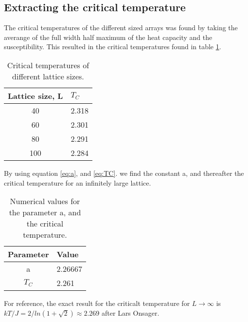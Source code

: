 \documentclass[../main.tex]{subfiles}
\begin{document}
\subsection{Extracting the critical temperature}
The critical temperatures of the different sized arrays was found by taking the averange of the full width half maximum of the heat capacity and the susceptibility. This resulted in the critical temperatures found in table \ref{tab:results-TC-lattices}.
\begin{table}[!h]
  \begin{center}
    \begin{tabular}{|c| l|}
      \hline
      Lattice size, L & $T_C$ \\
      \hline
      40 & 2.318\\
      60 & 2.301\\
      80 & 2.291\\
      100 & 2.284\\
      \hline
    \end{tabular}
    \caption{Critical temperatures of different lattice sizes.}
    \label{tab:results-TC-lattices}
  \end{center}
\end{table}
\FloatBarrier
By using equation \eqref{eq:a}, and \eqref{eq:TC}. we find the constant a, and thereafter the critical temperature for an infinitely large lattice.

\begin{table}[!h]
  \begin{center}
    \begin{tabular}{|c| l|}
      \hline
      Parameter & Value \\
      \hline
      a & 2.26667\\
      $T_C$ & 2.261\\
      \hline
    \end{tabular}
    \caption{Numerical values for the parameter a, and the critical temperature.}
    \label{tab:results-a-and-TC}
  \end{center}
\end{table}
\FloatBarrier

For reference, the exact result for the criticalt temperature for $L \rightarrow \infty$ is $kT/J = 2/ln(1 +\sqrt{2}) \approx 2.269$ after Lars Onsager.\cite{larsonsager}
\end{document}
